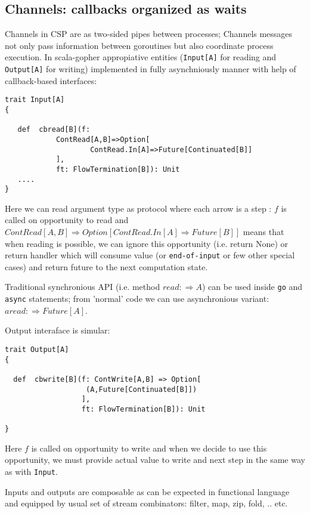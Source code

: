 \documentclass[12pt]{article}
\newcommand{\To}{\Rightarrow}
\begin{document}
\subsection{Channels: callbacks organized as waits}

  Channels in CSP are as two-sided pipes between processes; Channels messages not only pass information between goroutines but also coordinate process execution.
  In scala-gopher appropiative entities (\verb|Input[A]| for reading and \verb|Output[A]| for writing) implemented in fully asynchniously manner with help of callback-based interfaces:

\begin{Verbatim}[fontsize=\small]
trait Input[A]
{

   def  cbread[B](f:
            ContRead[A,B]=>Option[
                    ContRead.In[A]=>Future[Continuated[B]]
            ],
            ft: FlowTermination[B]): Unit
   ....
}
\end{Verbatim}

  Here we can read argument type as protocol where each arrow is a step : 
    $f$ is called on opportunity to read and
      $ContRead[A,B] \To Option[ContRead.In[A] \To Future[B]]$ means that when reading is 
   possible, we can ignore this opportunity (i.e. return None) or return handler which will
   consume value (or \verb|end-of-input| or few other special cases) and return future to the next 
   computation state.

  Traditional synchronious API  (i.e. method $read:\To A$) can be used inside \verb|go| and \verb|async| statements; from 'normal' code we can use asynchronious variant: $aread: \To Future[A]$.

  Output interaface is simular:
\begin{Verbatim}[fontsize=\small]
trait Output[A] 
{

  def  cbwrite[B](f: ContWrite[A,B] => Option[
                   (A,Future[Continuated[B]])
                  ],
                  ft: FlowTermination[B]): Unit
  
}
\end{Verbatim}
  Here $f$ is called on opportunity to write and when we decide to use this opportunity, we
 must provide actual value to write and next step in the same way as with \verb|Input|.

  Inputs and outputs are composable as can be expected in functional language and equipped by 
usual set of stream combinators: filter, map, zip, fold, .. etc.
 
\end{document}
